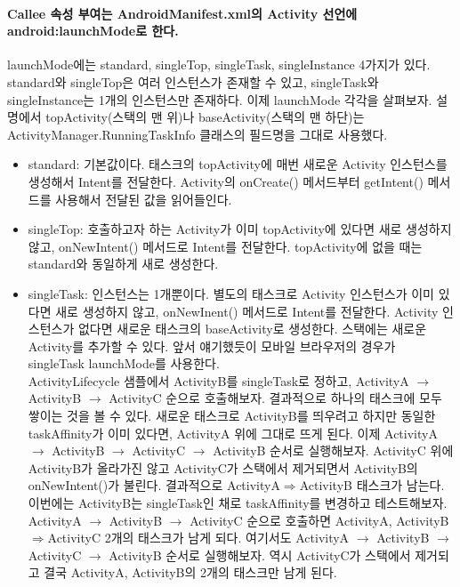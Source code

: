 \paragraph{Callee 속성 부여는 AndroidManifest.xml의 Activity 선언에 android:launchMode로 한다.}
launchMode에는 standard, singleTop, singleTask, singleInstance 4가지가 있다. 
standard와 singleTop은 여러 인스턴스가 존재할 수 있고, singleTask와 singleInstance는 1개의 인스턴스만 존재하다. 
이제 launchMode 각각을 살펴보자. 설명에서 topActivity(스택의 맨 위)나 baseActivity(스택의 맨 하단)는  ActivityManager.RunningTaskInfo 클래스의 필드명을 그대로 사용했다.
\begin{itemize}
\item standard: 기본값이다. 태스크의 topActivity에 매번 새로운 Activity 인스턴스를 생성해서 Intent를 전달한다. 
Activity의 onCreate() 메서드부터 getIntent() 메서드를 사용해서 전달된 값을 읽어들인다.

\item singleTop: 호출하고자 하는 Activity가 이미 topActivity에 있다면 새로 생성하지 않고, onNewIntent() 메서드로 Intent를 전달한다. topActivity에 없을 때는 standard와 동일하게 새로 생성한다.

\item singleTask: 인스턴스는 1개뿐이다. 별도의 태스크로 Activity 인스턴스가 이미 있다면 새로 생성하지 않고, onNewInent() 메서드로 Intent를 전달한다. 
Activity 인스턴스가 없다면 새로운 태스크의 baseActivity로 생성한다. 스택에는 새로운 Activity를 추가할 수 있다. 
앞서 얘기했듯이 모바일 브라우저의 경우가 singleTask launchMode를 사용한다.\\

ActivityLifecycle 샘플에서 ActivityB를 singleTask로 정하고, ActivityA $\rightarrow$ ActivityB $\rightarrow$ ActivityC 순으로 호출해보자. 결과적으로 하나의 태스크에 모두 쌓이는 것을 볼 수 있다. 
새로운 태스크로 ActivityB를 띄우려고 하지만 동일한 taskAffinity가 이미 있다면, ActivityA 위에 그대로 뜨게 된다.
이제 ActivityA $\rightarrow$ ActivityB $\rightarrow$ ActivityC $\rightarrow$ ActivityB 순서로 실행해보자. ActivityC 위에 ActivityB가 올라가진 않고 ActivityC가 스택에서 제거되면서 ActivityB의 onNewIntent()가 불린다. 결과적으로 ActivityA$\Rightarrow$ActivityB 태스크가 남는다.\\

이번에는 ActivityB는 singleTask인 채로 taskAffinity를 변경하고 테스트해보자. ActivityA $\rightarrow$ ActivityB $\rightarrow$ ActivityC 순으로 호출하면 ActivityA, ActivityB$\Rightarrow$ActivityC 2개의 태스크가 남게 되다. 
여기서도 ActivityA $\rightarrow$ Activi\-tyB $\rightarrow$ ActivityC $\rightarrow$ ActivityB 순서로 실행해보자. 
역시 ActivityC가 스택에서 제거되고 결국 ActivityA, ActivityB의 2개의 태스크만 남게 된다.\\


\end{itemize}
